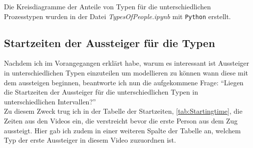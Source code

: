 Die Kreisdiagramme der Anteile von Typen für die unterschiedlichen Prozesstypen wurden in der Datei \textsl{TypesOfPeople.ipynb} mit \texttt{Python} erstellt.

\subsection{Startzeiten der Aussteiger für die Typen} \label{Startzeiten}
Nachdem ich im Vorangegangen erklärt habe, warum es interessant ist Aussteiger in unterschiedlichen Typen einzuteilen um modellieren zu können wann diese mit dem aussteigen beginnen, beantworte ich nun die aufgekommene Frage: "`Liegen die Startzeiten der Aussteiger für die unterschiedlichen Typen in unterschiedlichen Intervallen?"'\\
Zu diesem Zweck trug ich in der Tabelle der Startzeiten, \tablename \ref{tab:Startingtime}, die Zeiten aus den Videos ein, die verstreicht bevor die erste Person aus dem Zug aussteigt. Hier gab ich zudem in einer weiteren Spalte der Tabelle an, welchem Typ der erste Aussteiger in diesem Video zuzuordnen ist. 

